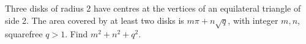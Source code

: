 Three disks of radius 2 have centres at the vertices of an equilateral triangle of side 2. The area covered by at least two disks is $m\pi+n\sqrt q$, with integer $m,n$, squarefree $q>1$. Find $m^2+n^2+q^2$.

